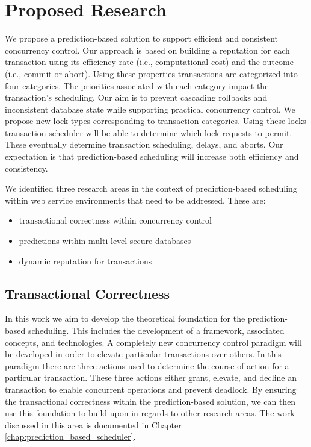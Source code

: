 \section{Proposed Research}
We propose a prediction-based solution to support efficient and consistent concurrency control. Our approach is based on building a reputation for each transaction using its efficiency rate (i.e., computational cost) and the outcome (i.e., commit or abort). Using these properties transactions are categorized into four categories. The priorities associated with each category impact the transaction's scheduling. Our aim is to prevent cascading rollbacks and inconsistent database state while supporting practical concurrency control. We propose new lock types corresponding to transaction categories. Using these locks transaction scheduler will be able to determine which lock requests to permit. These eventually determine transaction scheduling, delays, and aborts. Our expectation is that prediction-based scheduling will increase both efficiency and consistency.

We identified three research areas in the context of prediction-based scheduling within web service environments that need to be addressed. These are:
\begin{itemize}
    \item transactional correctness within concurrency control
    \item predictions within multi-level secure databases
    \item dynamic reputation for transactions
\end{itemize}

\subsection{Transactional Correctness}
In this work we aim to develop the theoretical foundation for the prediction-based scheduling. This includes the development of a framework, associated concepts, and technologies. A completely new concurrency control paradigm will be developed in order to elevate particular transactions over others. In this paradigm there are three actions used to determine the course of action for a particular transaction. These three actions either grant, elevate, and decline an transaction to enable concurrent operations and prevent deadlock. By ensuring the transactional correctness within the prediction-based solution, we can then use this foundation to build upon in regards to other research areas. The work discussed in this area is documented in Chapter \ref{chap:prediction_based_scheduler}.


